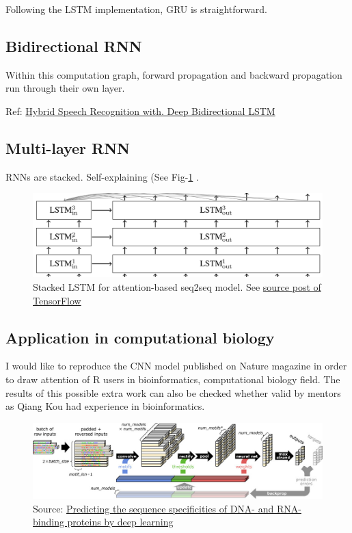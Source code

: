 \documentclass[]{article}
\begin{document}
Following the LSTM implementation, GRU is straightforward.

\subsection{Bidirectional RNN}\label{bidirectional-rnn}

Within this computation graph, forward propagation and backward
propagation run through their own layer.

Ref: \href{http://www.cs.toronto.edu/~graves/asru_2013.pdf}{Hybrid
Speech Recognition with. Deep Bidirectional LSTM}

\subsection{Multi-layer RNN}\label{multi-layer-rnn}

RNNs are stacked. Self-explaining (See Fig-\ref{fig:tensorflow} .

\begin{figure}[ht]
\centering
\includegraphics[width=0.8\linewidth]{attention_seq2seq.png}
\caption{Stacked LSTM for attention-based seq2seq model. See \href{https://www.tensorflow.org/versions/r0.7/tutorials/seq2seq/index.html}{source post of TensorFlow}}
\label{fig:tensorflow}
\end{figure}


\subsection{Application in computational
biology}\label{application-in-computational-biology}

I would like to reproduce the CNN model published on Nature magazine in
order to draw attention of R users in bioinformatics, computational
biology field. The results of this possible extra work can also be
checked whether valid by mentors as Qiang Kou had experience in
bioinformatics.

\begin{figure}[ht]
\centering
\includegraphics[width=0.8\linewidth]{nbt-cnn.jpg}
\caption{Source:
\href{http://www.nature.com/nbt/journal/v33/n8/full/nbt.3300.html}{Predicting
the sequence specificities of DNA- and RNA-binding proteins by deep
learning}}
\label{fig:10-}
\end{figure}
\end{document}
